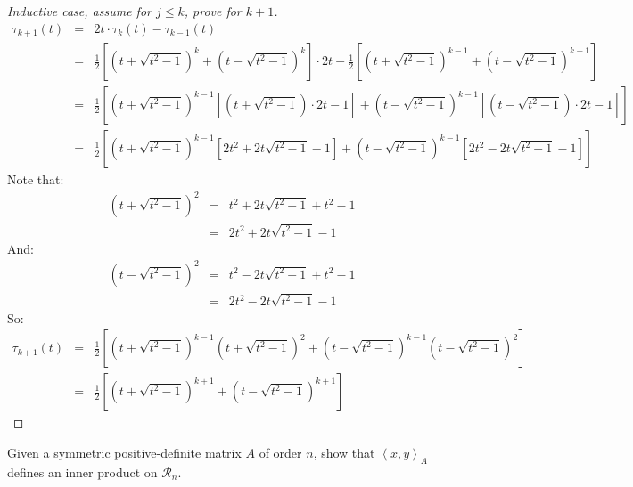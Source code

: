 \documentclass{article}
\newcommand{\ea}[1]{\begin{eqnarray*}#1\end{eqnarray*}}
\newcommand{\inner}[1]{\left\langle {#1} \right\rangle}
\newcommand{\R}{\mathcal{R}}
\begin{document}
\begin{proof}[Inductive case, assume for $j\le k$, prove for $k+1$]
\ea{
	\tau_{k+1}(t) &=&  2t\cdot\tau_k(t) - \tau_{k-1}(t) \\
	&=& \frac{1}{2}\left[ \left(t+\sqrt{t^2-1}\right)^k + \left(t-\sqrt{t^2-1}\right)^k\right]\cdot 2t -
	\frac{1}{2}\left[ \left(t+\sqrt{t^2-1}\right)^{k-1} + \left(t-\sqrt{t^2-1}\right)^{k-1}\right] \\
	&=& \frac{1}{2}\left[ \left(t+\sqrt{t^2-1}\right)^{k-1}\left[\left(t+\sqrt{t^2-1}\right)\cdot 2t - 1\right] +
	                      \left(t-\sqrt{t^2-1}\right)^{k-1}\left[\left(t-\sqrt{t^2-1}\right)\cdot 2t - 1\right] \right] \\
	&=& \frac{1}{2}\left[ \left(t+\sqrt{t^2-1}\right)^{k-1}\left[2t^2 + 2t\sqrt{t^2-1} -1\right] +
	                       \left(t-\sqrt{t^2-1}\right)^{k-1}\left[2t^2 - 2t\sqrt{t^2-1} -1\right] \right] 
}
Note that:
\ea{
(t+\sqrt{t^2-1})^2 &=& t^2+2t\sqrt{t^2-1} + t^2 -1 \\
											&=& 2t^2+2t\sqrt{t^2-1} -1 
}
And:
\ea{
	(t-\sqrt{t^2-1})^2 &=& t^2-2t\sqrt{t^2-1} + t^2 -1 \\
								     &=& 2t^2-2t\sqrt{t^2-1} -1 
}
So:
\ea{
	\tau_{k+1}(t) &=& \frac{1}{2}\left[ \left(t+\sqrt{t^2-1}\right)^{k-1}(t+\sqrt{t^2-1})^2 + 
										\left(t-\sqrt{t^2-1}\right)^{k-1}(t-\sqrt{t^2-1})^2 \right] \\
				&=& \frac{1}{2}\left[ \left(t+\sqrt{t^2-1}\right)^{k+1} + 
				        \left(t-\sqrt{t^2-1}\right)^{k+1}\right]
}
\end{proof}
 Given a symmetric positive-definite matrix $A$ of order $n$, show that
$\inner{x,y}_A$  defines an inner product on $\R_n$.
\end{document}
